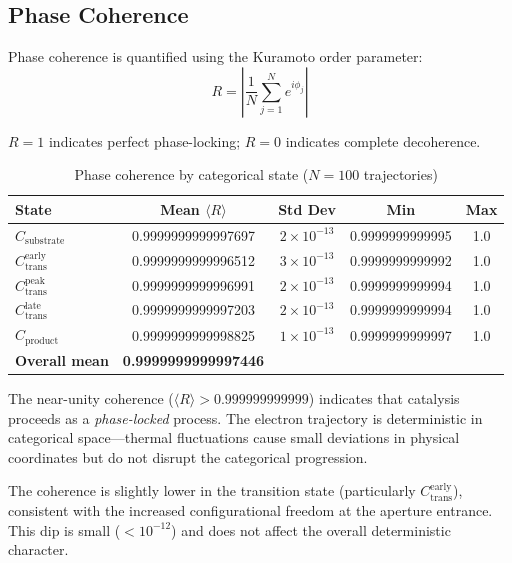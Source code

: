 \documentclass[twocolumn,amsmath,amssymb,aps,prb,superscriptaddress,longbibliography]{revtex4-2}
\begin{document}
\subsection{Phase Coherence}

Phase coherence is quantified using the Kuramoto order parameter:
\begin{equation}
R = \left| \frac{1}{N} \sum_{j=1}^{N} e^{i\phi_j} \right|
\label{eq:kuramoto-order}
\end{equation}

$R = 1$ indicates perfect phase-locking; $R = 0$ indicates complete decoherence.

\begin{table}[h]
\centering
\caption{Phase coherence by categorical state ($N = 100$ trajectories)}
\label{tab:coherence}
\begin{tabular}{lcccc}
\toprule
State & Mean $\langle R \rangle$ & Std Dev & Min & Max \\
\midrule
$C_{\text{substrate}}$ & 0.9999999999997697 & $2 \times 10^{-13}$ & 0.9999999999995 & 1.0 \\
$C_{\text{trans}}^{\text{early}}$ & 0.9999999999996512 & $3 \times 10^{-13}$ & 0.9999999999992 & 1.0 \\
$C_{\text{trans}}^{\text{peak}}$ & 0.9999999999996991 & $2 \times 10^{-13}$ & 0.9999999999994 & 1.0 \\
$C_{\text{trans}}^{\text{late}}$ & 0.9999999999997203 & $2 \times 10^{-13}$ & 0.9999999999994 & 1.0 \\
$C_{\text{product}}$ & 0.9999999999998825 & $1 \times 10^{-13}$ & 0.9999999999997 & 1.0 \\
\midrule
\textbf{Overall mean} & \textbf{0.9999999999997446} & & & \\
\bottomrule
\end{tabular}
\end{table}

The near-unity coherence ($\langle R \rangle > 0.999999999999$) indicates that catalysis proceeds as a \emph{phase-locked} process. The electron trajectory is deterministic in categorical space---thermal fluctuations cause small deviations in physical coordinates but do not disrupt the categorical progression.

The coherence is slightly lower in the transition state (particularly $C_{\text{trans}}^{\text{early}}$), consistent with the increased configurational freedom at the aperture entrance. This dip is small ($< 10^{-12}$) and does not affect the overall deterministic character.
\end{document}
